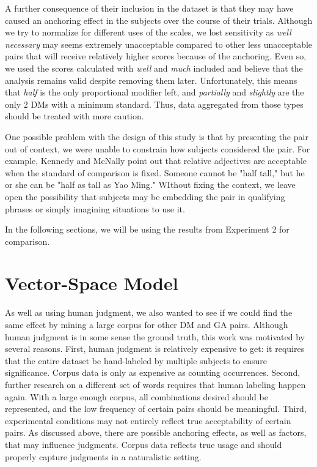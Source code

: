 \documentclass[11pt]{article}
\begin{document}
A further consequence of their inclusion in the dataset is that they may have caused an anchoring effect in the subjects over the course of their trials. Although we try to normalize for different uses of the scales, we lost sensitivity as \textit{well necessary} may seems extremely unacceptable compared to other less unacceptable pairs that will receive relatively higher scores because of the anchoring. Even so, we used the scores calculated with \textit{well} and \textit{much} included and believe that the analysis remains valid despite removing them later. Unfortunately, this means that \textit{half} is the only proportional modifier left, and \textit{partially} and \textit{slightly} are the only 2 DMs with a minimum standard. Thus, data aggregated from those types should be treated with more caution. 

One possible problem with the design of this study is that by presenting the pair out of context, we were unable to constrain how subjects considered the pair. For example, Kennedy and McNally  point out that relative adjectives are acceptable when the standard of comparison is fixed. Someone cannot be "half tall," but he or she can be "half as tall as Yao Ming." WIthout fixing the context, we leave open the possibility that subjects may be embedding the pair in qualifying phrases or simply imagining situations to use it.

In the following sections, we will be using the results from Experiment 2 for comparison.

\section{Vector-Space Model}

As well as using human judgment, we also wanted to see if we could find the same effect by mining a large corpus for other DM and GA pairs. Although human judgment is in some sense the ground truth, this work was motivated by several reasons. First, human judgment is relatively expensive to get: it requires that the entire dataset be hand-labeled by multiple subjects to ensure significance. Corpus data is only as expensive as counting occurrences. Second, further research on a different set of words requires that human labeling happen again. With a large enough corpus, all combinations desired should be represented, and the low frequency of certain pairs should be meaningful. Third, experimental conditions may not entirely reflect true acceptability of certain pairs. As discussed above, there are possible anchoring effects, as well as factors, that may influence judgments. Corpus data reflects true usage and should properly capture judgments in a naturalistic setting.
\end{document}
